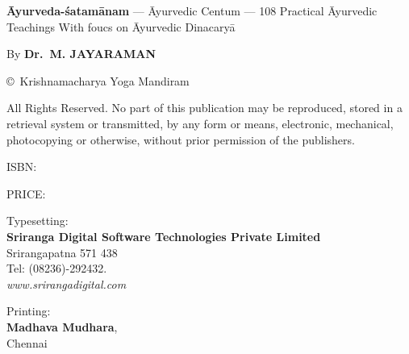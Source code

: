 \thispagestyle{empty}

\textbf{Āyurveda-śatamānam} --- Āyurvedic Centum --- 108 Practical Āyurvedic Teachings With foucs on Āyurvedic Dinacaryā
\smallskip

\noindent
By \textbf{Dr.\ M. JAYARAMAN} 
\vfill

\noindent
{\small\copyright\ Krishnamacharya Yoga Mandiram}
\bigskip

{\small
All Rights Reserved. No part of this publication may be reproduced, stored in a retrieval system or transmitted, by any form or means, electronic, mechanical, photocopying or otherwise, without prior permission of the publishers.}
\vfill

ISBN: 
\bigskip

PRICE:
\vfill

Typesetting:\\ 
\textbf{Sriranga Digital Software Technologies Private Limited}\\ 
Srirangapatna 571 438\\ 
Tel: (08236)-292432.\\ 
\textit{www.srirangadigital.com}
\vfill

Printing:\\ 
\textbf{Madhava Mudhara},\\ 
Chennai
